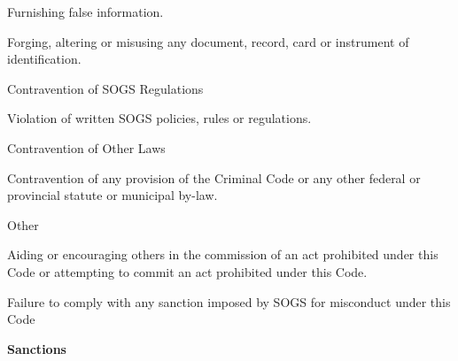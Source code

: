 \begin{longenum}[ label*=\arabic*., align=left]
\begin{longenum}[ label*=\arabic*., align=left]
\begin{longenum}[ label*=\arabic*., align=left]
                        \item Furnishing false information.
                        \item Forging,   altering   or   misusing   any   document,   record,   card   or   instrument   of identification.
                  \end{longenum}

                  \item Contravention of SOGS Regulations

                  \begin{longenum}[ label*=\arabic*., align=left]

                        \item  Violation of written SOGS policies, rules or regulations.
                  \end{longenum}
                  \item Contravention of Other Laws

                  \begin{longenum}[ label*=\arabic*., align=left]

                        \item Contravention of any provision of the Criminal Code or any other federal or provincial statute or municipal by-law.
                  \end{longenum}
                  \item Other

                  \begin{longenum}[ label*=\arabic*., align=left]

                        \item Aiding or encouraging others in the commission of an act prohibited under this Code or attempting to commit an act prohibited under this Code.
                        \item Failure  to  comply  with  any  sanction  imposed  by  SOGS  for  misconduct  under  this Code
                  \end{longenum}
  \end{longenum}
  
  \item \textbf{Sanctions}
  

\end{longenum}
